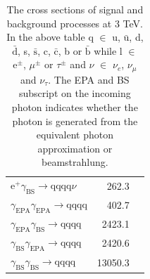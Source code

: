 \begin{table}[h!]
\begin{tabular}{ l r r }
$\text{e}^{+}\gamma_{\text{BS}} \rightarrow \text{qqqq}\nu$ & 262.3 \\
$\gamma_{\text{EPA}}\gamma_{\text{EPA}} \rightarrow \text{qqqq}$ & 402.7 \\
$\gamma_{\text{EPA}}\gamma_{\text{BS}} \rightarrow \text{qqqq}$ & 2423.1 \\
$\gamma_{\text{BS}}\gamma_{\text{EPA}} \rightarrow \text{qqqq}$ & 2420.6 \\
$\gamma_{\text{BS}}\gamma_{\text{BS}} \rightarrow \text{qqqq}$ & 13050.3 \\
\hline
\end{tabular}
\caption[The cross sections of signal and background processes at 3 TeV. In the above table q $\in$ u, $\bar{\text{u}}$, d, $\bar{\text{d}}$, s, $\bar{\text{s}}$, c, $\bar{\text{c}}$, b or $\bar{\text{b}}$ while l $\in$ $\text{e}^{\pm}$, $\mu^{\pm}$ or $\tau^{\pm}$ and $\nu$ $\in$ $\nu_{e}$, $\nu_{\mu}$ and $\nu_{\tau}$.  The EPA and BS subscript on the incoming photon indicates whether the photon is generated from the equivalent photon approximation or beamstrahlung.]{The cross sections of signal and background processes at 3 TeV. In the above table q $\in$ u, $\bar{\text{u}}$, d, $\bar{\text{d}}$, s, $\bar{\text{s}}$, c, $\bar{\text{c}}$, b or $\bar{\text{b}}$ while l $\in$ $\text{e}^{\pm}$, $\mu^{\pm}$ or $\tau^{\pm}$ and $\nu$ $\in$ $\nu_{e}$, $\nu_{\mu}$ and $\nu_{\tau}$.  The EPA and BS subscript on the incoming photon indicates whether the photon is generated from the equivalent photon approximation or beamstrahlung.}
\label{table:crosssection3000GeV}
\end{table}

